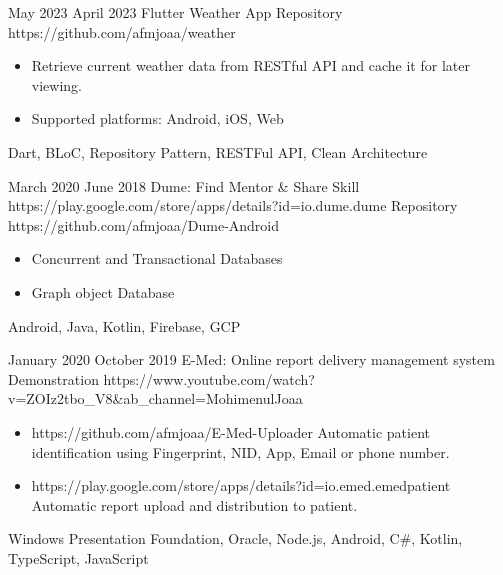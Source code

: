 \begin{universalList}
  \emptySeparator
  \universalListItemWithoutLink
    {May 2023}
    {April 2023}
    {Flutter Weather App}
    {Repository}
    {https://github.com/afmjoaa/weather}
    {
      \begin{itemize}
        \item Retrieve current weather data from RESTful API and cache it for later viewing.
        \item Supported platforms: Android, iOS, Web
      \end{itemize}
    }
    {Dart, BLoC, Repository Pattern, RESTFul API, Clean Architecture}

  \emptySeparator
  \universalListItem
    {March 2020}
    {June 2018}
    {Dume: Find Mentor \& Share Skill}
    {https://play.google.com/store/apps/details?id=io.dume.dume}
    {Repository}
    {https://github.com/afmjoaa/Dume-Android}
    {
      \begin{itemize}
        \item Concurrent and Transactional Databases
        \item Graph object Database
      \end{itemize}
    }
    {Android, Java, Kotlin, Firebase, GCP}

  \emptySeparator
  \universalListItemWithoutLink
    {January 2020}
    {October 2019}
    {E-Med: Online report delivery management system}
    {Demonstration}
    {https://www.youtube.com/watch?v=ZOIz2tbo_V8&ab_channel=MohimenulJoaa}
    {
      \begin{itemize}
        \item https://github.com/afmjoaa/E-Med-Uploader Automatic patient identification using Fingerprint, NID, App, Email or phone number.
        \item https://play.google.com/store/apps/details?id=io.emed.emedpatient Automatic report upload and distribution to patient.
      \end{itemize}
    }
    {Windows Presentation Foundation, Oracle, Node.js, Android, C\#, Kotlin, TypeScript, JavaScript}

\end{universalList}
